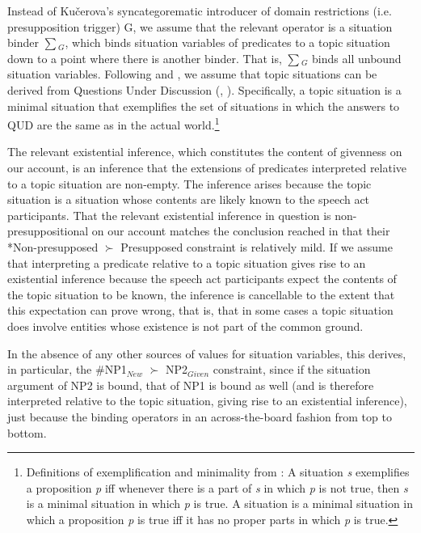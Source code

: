 \documentclass[output=paper,modfonts,nonflat]{langsci/langscibook}
\begin{document}
Instead of Ku\v{c}erova's syncategorematic introducer of domain restrictions (i.e. presupposition trigger) G, we assume that the relevant operator is a situation binder $\sum$$_{G}$, which binds situation variables of predicates to a topic situation down to a point where there is another binder. That is, $\sum$$_{G}$ binds all unbound situation variables. Following \citet{Kratzer:2017} and \citet[127--133]{Schwarz:2009}, we assume that topic situations can be derived from Questions Under Discussion (\citet{Roberts:1996}, \citet{Buring:2003}). Specifically, a topic situation is a minimal situation that exemplifies the set of situations in which the answers to QUD are the same as in the actual world.\footnote{Definitions of exemplification and minimality from \citet{Kratzer:2017}: A situation {\it s} exemplifies a proposition {\it p} iff whenever there is a part of {\it s} in which {\it p} is not true, then {\it s} is a minimal situation in which {\it p} is true.  A situation is a minimal situation in which a proposition {\it p} is true iff  it has no proper parts in which {\it p} is true.} 

The relevant existential inference, which constitutes the content of givenness on our account, is an inference that the extensions of predicates interpreted relative to a topic situation are non-empty. The inference arises because the topic situation is a situation whose contents are likely known to the speech act participants. That the relevant existential inference in question is non-presuppositional on our account matches the conclusion reached in \citet{SimikWierzba:2015} that their *Non-presupposed $\succ$ Presupposed constraint is relatively mild. If we assume that interpreting a predicate relative to a topic situation gives rise to an existential inference because the speech act participants expect the contents of the topic situation to be known, the inference is cancellable to the extent that this expectation can prove wrong, that is, that in some cases a topic situation does involve entities whose existence is not part of the common ground.

In the absence of any other sources of values for situation variables, this derives, in particular, the \#NP1$_{New}$ $\succ$ NP2$_{Given}$ constraint, since if the situation argument of NP2 is bound, that of NP1 is bound as well (and is therefore interpreted relative to the topic situation, giving rise to an existential inference), just because the binding operators in an across-the-board fashion from top to bottom.
\end{document}

